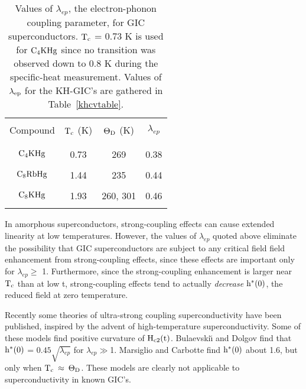 \begin{table}
\caption[Values of $\lambda_{ep}$, the electron-phonon coupling parameter, for
GIC  superconductors.]{Values  of $\lambda_{ep}$, the  electron-phonon  coupling
parameter, for GIC superconductors. $\rm T_c$ = 0.73 K\cite{iye82} is used
for $\rm C_4KHg$ since no transition was observed down to 0.8 K during the
specific-heat measurement.\cite{alexander81}  Values of $\rm \lambda_{ep}$
for the KH-GIC's are gathered in Table~\ref{khcvtable}.}
\label{lambdatable}
\begin{center}
\begin{tabular}{|c|ccc|}
\hline
& & & \\
Compound & $\rm T_c$ (K) & $\rm \Theta_D$ (K) & $\lambda_{ep}$ \\
& & & \\
\hline
& & & \\
$\rm C_4KHg$ & 0.73\cite{iye82} & 269\cite{alexander81} & 0.38\cite{iye82} \\
& & & \\
$\rm C_8RbHg$ & 1.44\cite{alexander81} & 235\cite{alexander81} & 0.44\cite{iye82,alexander81} \\
& & & \\
$\rm C_8KHg$ & 1.93\cite{alexander81} & 260\cite{alexander81}, 301\cite{alexander80} & 0.46\cite{tanuma81,alexander80} \\
& & & \\
\hline
\end{tabular}
\end{center}
\end{table}

        In  amorphous superconductors, strong-coupling  effects   can cause
extended linearity at   low temperatures.\cite{bergmann74} However,   the
values  of   $\lambda_{ep}$ quoted  above  eliminate    the possibility that GIC
superconductors are subject  to  any critical field field  enhancement from
strong-coupling effects, since   these   effects are   important  only  for
$\lambda_{ep} \geq$ 1.  Furthermore,
since    the strong-coupling  enhancement   is  larger   near    $\rm   T_c$  than  at  low
t,\cite{decroux82,dalrymple83} strong-coupling effects tend  to actually {\em decrease}
$\rm h^*(0)$, the reduced field at zero temperature.

        Recently  some theories of  ultra-strong coupling superconductivity
have been pub\-lished,  in\-spired by the  ad\-vent of high-tem\-per\-ature
su\-per\-con\-duct\-ivity.\cite{bulaevskii87,marsiglio87} Some of these models find
pos\-i\-tive     cur\-va\-ture  of    $\rm  H_{c2}(t)$.    Bu\-laev\-ski\u{\i}      and
Dol\-gov\cite{bulaevskii87}      find        that       $\rm    h^*(0)$     =
$0.45\sqrt{\lambda_{ep}}$ for $\lambda_{ep} \gg $1.  Marsiglio and Carbotte
find   $\rm  h^*(0)$  about 1.6, but  only   when  $\rm T_c   \: \approx \:
\Theta_D$.\cite{marsiglio87} These   models are  clearly not applicable  to
superconductivity in known GIC's.

